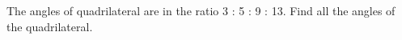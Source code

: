 The angles of quadrilateral are in the ratio 3 : 5
: 9 : 13. Find all the angles of the quadrilateral.